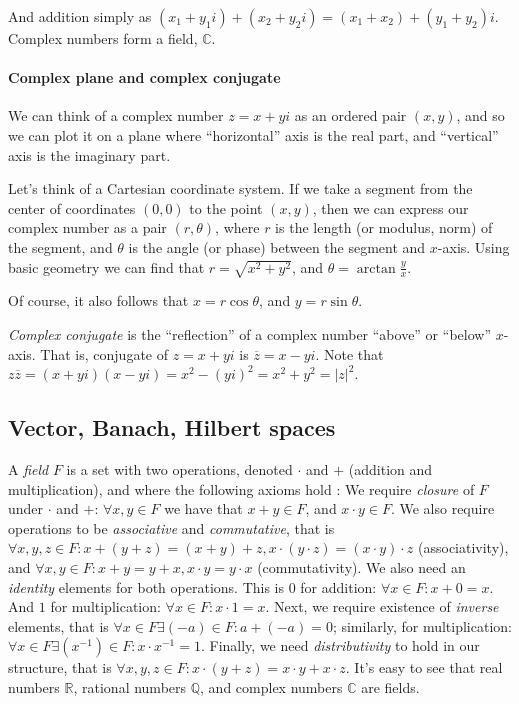 \documentclass[10pt]{article}
\begin{document}
And addition simply as $(x_1 + y_1i) + (x_2 + y_2i) = (x_1 + x_2) + (y_1 +
y_2)i$. Complex numbers form a field, $\mathbb{C}$.

\paragraph{Complex plane and complex conjugate} We can think of a complex
number $z = x+yi$ as an ordered pair $(x, y)$, and so we can plot it on a plane
where ``horizontal'' axis is the real part, and ``vertical'' axis is the
imaginary part. 

Let's think of a Cartesian coordinate system. If we take a segment from the
center of coordinates $(0,0)$ to the point $(x, y)$, then we can express our
complex number as a pair $(r, \theta)$, where $r$ is the length (or modulus,
norm) of the segment, and $\theta$ is the angle (or phase) between the segment
and $x$-axis. Using basic geometry we can find that $r = \sqrt{x^2+y^2}$, and
$\theta=\arctan{\frac{y}{x}}$. 

Of course, it also follows that $x = r\cos \theta$, and $y = r\sin \theta$.

{\it Complex conjugate} is the ``reflection'' of a complex number ``above'' or
``below'' $x$-axis. That is, conjugate of $z=x+yi$ is $\overline{z}=x-yi$. Note
that $z\overline{z}=(x+yi)(x-yi)=x^2-(yi)^2=x^2+y^2=|z|^2$.

\centerline{}

\subsection*{Vector, Banach, Hilbert spaces}

A {\it field} $F$ is a set with two operations, denoted $\cdot$ and $+$
(addition and multiplication), and where the following axioms hold
\cite{Petersen2012}: We require {\it closure} of $F$ under $\cdot$ and $+$:
$\forall x, y \in F$ we have that $x+y\in F$, and $x\cdot y\in F$. We also
require operations to be {\it associative} and {\it commutative}, that is
$\forall x, y, z \in F: x+(y+z)=(x+y)+z, x\cdot(y\cdot z)=(x\cdot y)\cdot z$
(associativity), and $\forall x, y \in F: x+y=y+x, x\cdot y=y \cdot x$
(commutativity). We also need an {\it identity} elements for both operations.
This is $0$ for addition: $\forall x \in F: x+0=x$. And $1$ for multiplication:
$\forall x \in F: x\cdot 1=x$. Next, we require existence of {\it inverse}
elements, that is $\forall x \in F \exists (-a) \in F: a+(-a)=0$; similarly,
for multiplication: $\forall x \in F\exists(x^{-1})\in F: x\cdot x^{-1}=1$.
Finally, we need {\it distributivity} to hold in our structure, that is
$\forall x, y, z \in F: x\cdot(y+z)=x \cdot y + x\cdot z$. It's easy to see
that real numbers $\mathbb{R}$, rational numbers $\mathbb{Q}$, and complex
numbers $\mathbb{C}$ are fields.
\end{document}
